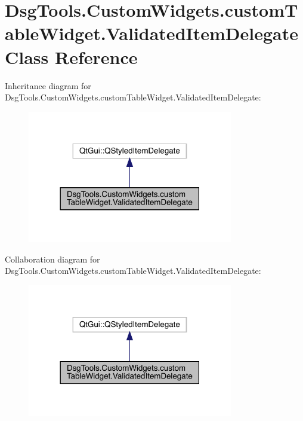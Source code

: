 \hypertarget{class_dsg_tools_1_1_custom_widgets_1_1custom_table_widget_1_1_validated_item_delegate}{}\section{Dsg\+Tools.\+Custom\+Widgets.\+custom\+Table\+Widget.\+Validated\+Item\+Delegate Class Reference}
\label{class_dsg_tools_1_1_custom_widgets_1_1custom_table_widget_1_1_validated_item_delegate}


Inheritance diagram for Dsg\+Tools.\+Custom\+Widgets.\+custom\+Table\+Widget.\+Validated\+Item\+Delegate\+:
\nopagebreak
\begin{figure}[H]
\begin{center}
\leavevmode
\includegraphics[width=254pt]{class_dsg_tools_1_1_custom_widgets_1_1custom_table_widget_1_1_validated_item_delegate__inherit__graph}
\end{center}
\end{figure}


Collaboration diagram for Dsg\+Tools.\+Custom\+Widgets.\+custom\+Table\+Widget.\+Validated\+Item\+Delegate\+:
\nopagebreak
\begin{figure}[H]
\begin{center}
\leavevmode
\includegraphics[width=254pt]{class_dsg_tools_1_1_custom_widgets_1_1custom_table_widget_1_1_validated_item_delegate__coll__graph}
\end{center}
\end{figure}
